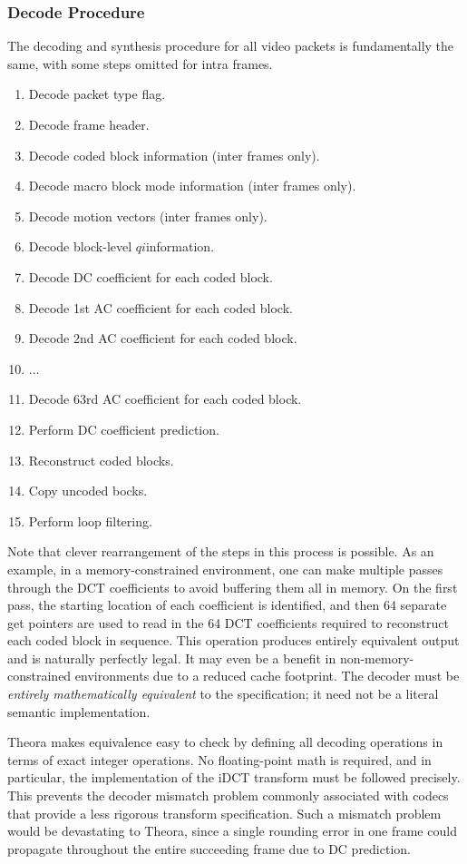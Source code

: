 \documentclass[11pt,letterpaper]{article}
\newcommand{\qi}{\ensuremath{\mathit{qi}}}
\begin{document}
\subsubsection{Decode Procedure}

The decoding and synthesis procedure for all video packets is fundamentally the
 same, with some steps omitted for intra frames.
\begin{enumerate}
\item
Decode packet type flag.
\item
Decode frame header.
\item
Decode coded block information (inter frames only).
\item
Decode macro block mode information (inter frames only).
\item
Decode motion vectors (inter frames only).
\item
Decode block-level \qi information.
\item
Decode DC coefficient for each coded block.
\item
Decode 1st AC coefficient for each coded block.
\item
Decode 2nd AC coefficient for each coded block.
\item
$\ldots$
\item
Decode 63rd AC coefficient for each coded block.
\item Perform DC coefficient prediction.
\item Reconstruct coded blocks.
\item Copy uncoded bocks.
\item Perform loop filtering.
\end{enumerate}

Note that clever rearrangement of the steps in this process is possible.
As an example, in a memory-constrained environment, one can make multiple
 passes through the DCT coefficients to avoid buffering them all in memory.
On the first pass, the starting location of each coefficient is identified, and
 then 64 separate get pointers are used to read in the 64 DCT coefficients
 required to reconstruct each coded block in sequence.
This operation produces entirely equivalent output and is naturally perfectly
 legal.
It may even be a benefit in non-memory-constrained environments due to a
 reduced cache footprint.
The decoder must be {\em entirely mathematically equivalent} to the
 specification; it need not be a literal semantic implementation.

Theora makes equivalence easy to check by defining all decoding operations in
 terms of exact integer operations.
No floating-point math is required, and in particular, the implementation of
 the iDCT transform must be followed precisely.
This prevents the decoder mismatch problem commonly associated with codecs that
 provide a less rigorous transform specification.
Such a mismatch problem would be devastating to Theora, since a single rounding
 error in one frame could propagate throughout the entire succeeding frame due
 to DC prediction.
\end{document}

